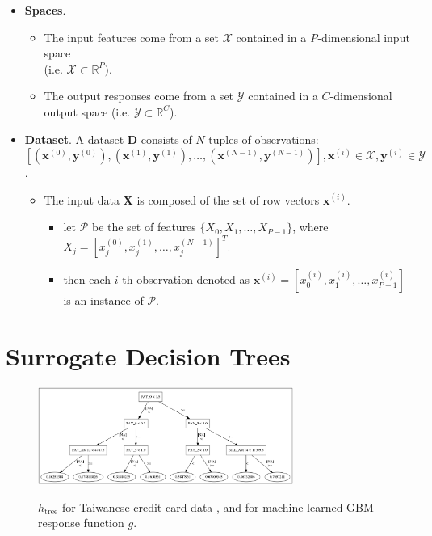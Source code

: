 \documentclass{article}
\begin{document}
\begin{itemize}
	\item \textbf{Spaces}.  
	\begin{itemize}
		\item The input features come from a set  $\mathcal{X}$ contained in a \textit{P}-dimensional input space\\ (i.e. $\mathcal{X} \subset \mathbb{R}^P)$.  
		\item The output responses come from a set $\mathcal{Y}$ contained in a $C$-dimensional output space (i.e. $\mathcal{Y} \subset \mathbb{R}^C$).
	\end{itemize}	
	\bigskip	
	\item \textbf{Dataset}. A dataset $\mathbf{D}$ consists of $N$ tuples of observations:\\ $[(\mathbf{x}^{(0)},\mathbf{y}^{(0)}), (\mathbf{x}^{(1)},\mathbf{y}^{(1)}), \dots, (\mathbf{x}^{(N-1)},\mathbf{y}^{(N-1)})], \mathbf{x}^{(i)} \in \mathcal{X}, \mathbf{y}^{(i)} \in \mathcal{Y}$.\\
	\begin{itemize}
		\item The input data $\mathbf{X}$ is composed of the set of row vectors $\mathbf{x}^{(i)}$. 
		\begin{itemize}
			\item let $\mathcal{P}$ be the set of features  $\{X_0, X_1, \dots, X_{P-1}\}$, where $X_j = \left[x_{j}^{(0)}, x_{j}^{(1)}, \dots, x_{j}^{(N-1)} \right]^T$.
			\item then each $i$-th observation denoted as $\mathbf{x}^{(i)} = \left[x_0^{(i)}, x_1^{(i)}, \dots, x_{P-1}^{(i)} \right]$ is an instance of $\mathcal{P}$.
		\end{itemize}
	\end{itemize}
\end{itemize}

\section{Surrogate Decision Trees} \label{sec:surrogate_dt}


\begin{figure}[htb]
	\begin{center}
		\includegraphics[height=90pt]{img/dt_surrogate.png}
		\label{fig:dt_surrogate}
		\caption{$h_{\text{tree}}$ for Taiwanese credit card data \cite{uci}, and for machine-learned GBM response function $g$.}
	\end{center}
\end{figure}
\end{document}
